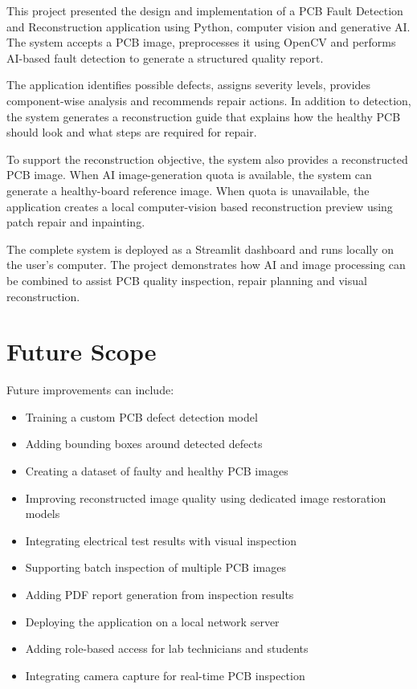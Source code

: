 \documentclass[12pt,a4paper]{report}
\begin{document}
This project presented the design and implementation of a PCB Fault Detection and Reconstruction application using Python, computer vision and generative AI. The system accepts a PCB image, preprocesses it using OpenCV and performs AI-based fault detection to generate a structured quality report.

The application identifies possible defects, assigns severity levels, provides component-wise analysis and recommends repair actions. In addition to detection, the system generates a reconstruction guide that explains how the healthy PCB should look and what steps are required for repair.

To support the reconstruction objective, the system also provides a reconstructed PCB image. When AI image-generation quota is available, the system can generate a healthy-board reference image. When quota is unavailable, the application creates a local computer-vision based reconstruction preview using patch repair and inpainting.

The complete system is deployed as a Streamlit dashboard and runs locally on the user's computer. The project demonstrates how AI and image processing can be combined to assist PCB quality inspection, repair planning and visual reconstruction.

\chapter{Future Scope}

Future improvements can include:

\begin{itemize}
    \item Training a custom PCB defect detection model
    \item Adding bounding boxes around detected defects
    \item Creating a dataset of faulty and healthy PCB images
    \item Improving reconstructed image quality using dedicated image restoration models
    \item Integrating electrical test results with visual inspection
    \item Supporting batch inspection of multiple PCB images
    \item Adding PDF report generation from inspection results
    \item Deploying the application on a local network server
    \item Adding role-based access for lab technicians and students
    \item Integrating camera capture for real-time PCB inspection
\end{itemize}
\end{document}
